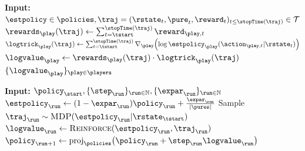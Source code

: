 \begin{figure}[t]
\begin{minipage}{0.49\textwidth}
\begin{algorithm}[H]
\caption{\reinforce}
\label{alg:reinforce}
\begin{algorithmic}[1]
	\State 
	\textbf{Input:} $\estpolicy \in \policies, \traj = (\rstate_{\time}, \pure_{\time}, \reward_{\time})_{\time \le \stopTime(\traj)} \in\mathcal{T}$\vskip 3pt
	\vskip 3pt
	\State 
		$\rewards_\play\parens{\traj} \leftarrow \sum_{\time=\tstart}^{\stopTime\parens{\traj}}\reward_{\play,\time}$\vskip 3pt
	\State 
		$\logtrick_\play\parens{\traj} \leftarrow \sum_{\time=\tstart}^{\stopTime\parens{\traj}} \nabla_{\play} \parens*{\log\estpolicy_\play\parens{\action_{\play,\time}|\rstate_\time}}$\vskip 3pt
	\State $\logvalue_\play \leftarrow \rewards_\play\parens{\traj}\cdot\logtrick_\play\parens{\traj}$\vskip 3pt
	\EndFor\vskip 3pt
	\State
	\Return $\braces{\logvalue_\play}_{\play\in\players}$
	\end{algorithmic}
\end{algorithm}
\end{minipage}
\hfill
\begin{minipage}{0.49\textwidth}
\begin{algorithm}[H]
\caption{\greedy}
\label{alg:greedy}
\begin{algorithmic}[1]
	\State
	\textbf{Input:} $\policy_{\start}, \{\step_{\run}\}_{\run \in \N}, \{\expar_{\run}\}_{\run \in \N}$\vskip 3pt
	\For{$\run = \start,\afterstart,\dots$}\vskip 3pt
	\State
	$\estpolicy_{\run}\leftarrow (1-\expar_\run) \policy_{\run} + \frac{\expar_\run}{\abs{\pures}}$\vskip 3pt
	\State
	Sample $\traj_{\run} \sim \MDP(\estpolicy_{\run}|\rstate_\tstart)$\vskip 3pt
	\State
	$\logvalue_{\run} \leftarrow \reinforce(\estpolicy_{\run},\traj_{\run})$\vskip 3pt
	\State
	$\policy_{\run+1} \leftarrow \proj_{\policies}\parens*{\policy_{\run} + \step_{\run}\logvalue_{\run}}$\vskip 3pt
\EndFor \vskip 5pt
\end{algorithmic}
\end{algorithm}
\end{minipage}
\end{figure}



